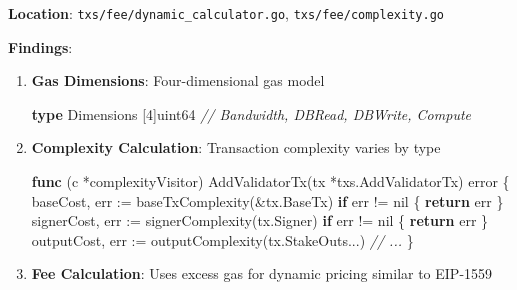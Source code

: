 \documentclass[
]{article}
\newenvironment{Shaded}{}{}
\newcommand{\CommentTok}[1]{\textcolor[rgb]{0.38,0.63,0.69}{\textit{#1}}}
\newcommand{\ControlFlowTok}[1]{\textcolor[rgb]{0.00,0.44,0.13}{\textbf{#1}}}
\newcommand{\DataTypeTok}[1]{\textcolor[rgb]{0.56,0.13,0.00}{#1}}
\newcommand{\DecValTok}[1]{\textcolor[rgb]{0.25,0.63,0.44}{#1}}
\newcommand{\KeywordTok}[1]{\textcolor[rgb]{0.00,0.44,0.13}{\textbf{#1}}}
\newcommand{\NormalTok}[1]{#1}
\newcommand{\OperatorTok}[1]{\textcolor[rgb]{0.40,0.40,0.40}{#1}}
\newcommand{\OtherTok}[1]{\textcolor[rgb]{0.00,0.44,0.13}{#1}}
\begin{document}
\textbf{Location}: \texttt{txs/fee/dynamic\_calculator.go},
\texttt{txs/fee/complexity.go}

\textbf{Findings}:

\begin{enumerate}
\def\labelenumi{\arabic{enumi}.}
\item
  \textbf{Gas Dimensions}: Four-dimensional gas model

\begin{Shaded}
\begin{Highlighting}[]
\KeywordTok{type}\NormalTok{ Dimensions }\OperatorTok{[}\DecValTok{4}\OperatorTok{]}\DataTypeTok{uint64}  \CommentTok{// Bandwidth, DBRead, DBWrite, Compute}
\end{Highlighting}
\end{Shaded}
\item
  \textbf{Complexity Calculation}: Transaction complexity varies by type

\begin{Shaded}
\begin{Highlighting}[]
\KeywordTok{func} \OperatorTok{(}\NormalTok{c }\OperatorTok{*}\NormalTok{complexityVisitor}\OperatorTok{)}\NormalTok{ AddValidatorTx}\OperatorTok{(}\NormalTok{tx }\OperatorTok{*}\NormalTok{txs}\OperatorTok{.}\NormalTok{AddValidatorTx}\OperatorTok{)} \DataTypeTok{error} \OperatorTok{\{}
\NormalTok{    baseCost}\OperatorTok{,}\NormalTok{ err }\OperatorTok{:=}\NormalTok{ baseTxComplexity}\OperatorTok{(\&}\NormalTok{tx}\OperatorTok{.}\NormalTok{BaseTx}\OperatorTok{)}
    \ControlFlowTok{if}\NormalTok{ err }\OperatorTok{!=} \OtherTok{nil} \OperatorTok{\{}
        \ControlFlowTok{return}\NormalTok{ err}
    \OperatorTok{\}}
\NormalTok{    signerCost}\OperatorTok{,}\NormalTok{ err }\OperatorTok{:=}\NormalTok{ signerComplexity}\OperatorTok{(}\NormalTok{tx}\OperatorTok{.}\NormalTok{Signer}\OperatorTok{)}
    \ControlFlowTok{if}\NormalTok{ err }\OperatorTok{!=} \OtherTok{nil} \OperatorTok{\{}
        \ControlFlowTok{return}\NormalTok{ err}
    \OperatorTok{\}}
\NormalTok{    outputCost}\OperatorTok{,}\NormalTok{ err }\OperatorTok{:=}\NormalTok{ outputComplexity}\OperatorTok{(}\NormalTok{tx}\OperatorTok{.}\NormalTok{StakeOuts}\OperatorTok{...)}
    \CommentTok{// ...}
\OperatorTok{\}}
\end{Highlighting}
\end{Shaded}
\item
  \textbf{Fee Calculation}: Uses excess gas for dynamic pricing similar
  to EIP-1559
\end{enumerate}
\end{document}
